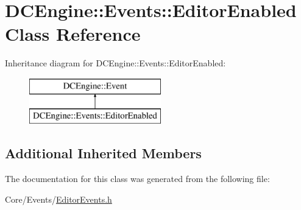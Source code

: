 \hypertarget{classDCEngine_1_1Events_1_1EditorEnabled}{\section{D\-C\-Engine\-:\-:Events\-:\-:Editor\-Enabled Class Reference}
\label{classDCEngine_1_1Events_1_1EditorEnabled}
}
Inheritance diagram for D\-C\-Engine\-:\-:Events\-:\-:Editor\-Enabled\-:\begin{figure}[H]
\begin{center}
\leavevmode
\includegraphics[height=2.000000cm]{classDCEngine_1_1Events_1_1EditorEnabled}
\end{center}
\end{figure}
\subsection*{Additional Inherited Members}


The documentation for this class was generated from the following file\-:\begin{DoxyCompactItemize}
\item 
Core/\-Events/\hyperlink{EditorEvents_8h}{Editor\-Events.\-h}\end{DoxyCompactItemize}
